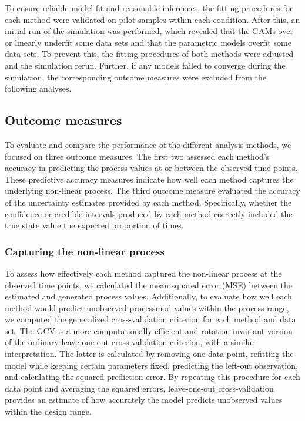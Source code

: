 \documentclass[man, floatsintext]{apa7}
\begin{document}
To ensure reliable model fit and reasonable inferences, the fitting procedures
for each method were validated on pilot samples within each condition. After
this, an initial run of the simulation was performed, which revealed that the
GAMs over- or linearly underfit some data sets and that the parametric models
overfit some data sets. To prevent this, the fitting procedures of both methods
were adjusted and the simulation rerun. Further, if any models failed to
converge during the simulation, the corresponding outcome measures were
excluded from the following analyses.

\subsection{Outcome measures}

To evaluate and compare the performance of the different analysis methods, we
focused on three outcome measures. The first two assessed each method's
accuracy in predicting the process values at or between the observed time
points. These predictive accuracy measures indicate how well each method
captures the underlying non-linear process. The third outcome measure evaluated
the accuracy of the uncertainty estimates provided by each method.
Specifically, whether the confidence or credible intervals produced by each
method correctly included the true state value the expected proportion of
times.

\subsubsection{Capturing the non-linear process}

To assess how effectively each method captured the non-linear process at the
observed time points, we calculated the mean squared error (MSE) between the
estimated and generated process values. Additionally, to evaluate how well each
method would predict unobserved processmod values within the process range, we
computed the generalized cross-validation
\parencite[GCV;][]{golub_generalized_1979} criterion for each method and data
set. The GCV is a more computationally efficient and rotation-invariant version
of the ordinary leave-one-out cross-validation criterion, with a similar
interpretation. The latter is calculated by removing one data point, refitting
the model while keeping certain parameters fixed, predicting the left-out
observation, and calculating the squared prediction error. By repeating this
procedure for each data point and averaging the squared errors, leave-one-out
cross-validation provides an estimate of how accurately the model predicts
unobserved values within the design range.
\end{document}
